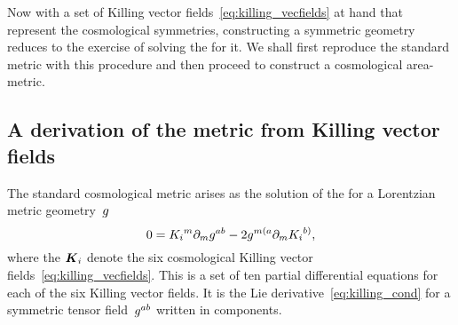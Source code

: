 Now with a set of Killing vector fields~\eqref{eq:killing_vecfields} at hand that represent the cosmological symmetries, constructing a symmetric geometry reduces to the exercise of solving the  for it. We shall first reproduce the standard \FLRW{} metric with this procedure and then proceed to construct a cosmological area-metric.

\subsection{A derivation of the \FLRW{} metric from Killing vector fields}\label{sec:flrw_deriv}

The standard cosmological \FLRW{} metric arises as the solution of the  for a Lorentzian metric geometry~$g$
\begin{equation}\label{eq:metric_killing_cond}
	0={K_i}^m\partial_m g^{ab}-2g^{m( a}\partial_m{K_i}^{b)}
	\mathpunct{,}
\end{equation}
where the $\boldsymbol{K}_i$ denote the six cosmological Killing vector fields~\eqref{eq:killing_vecfields}. This is a set of ten partial differential equations for each of the six Killing vector fields. It is the Lie derivative~\eqref{eq:killing_cond} for a symmetric tensor field~$g^{ab}$ written in components.

